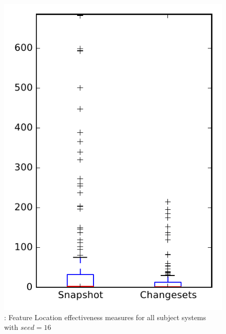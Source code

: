 
\begin{figure}
\centering
\includegraphics[height=0.4\textheight]{figures/flt_seed/rq1_overview_16}
\caption{\rone: Feature Location effectiveness measures for all subject systems with $seed=16$}
\label{fig:flt_seed:rq1:overview}
\end{figure}

